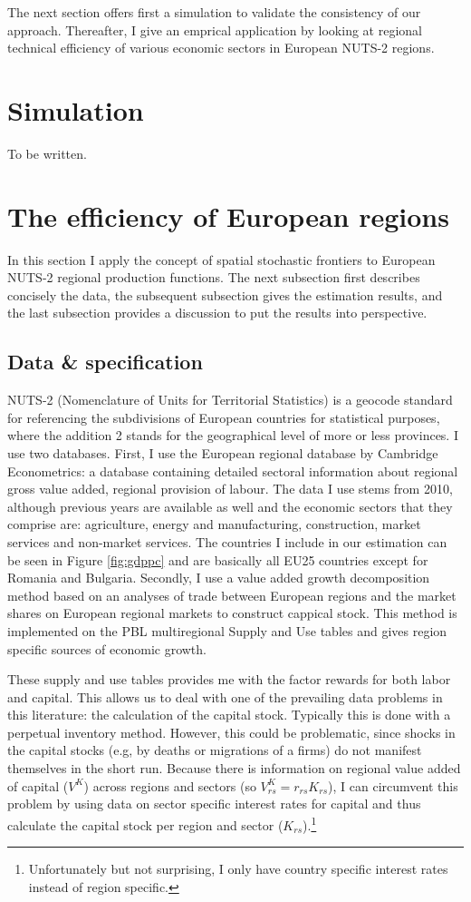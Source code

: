 \documentclass[11pt,parskip,abstracton,notitlepage]{scrartcl}
\begin{document}
The next section offers first a simulation to validate the consistency of our
approach. Thereafter, I give an emprical application by looking at regional technical efficiency of various economic sectors in European NUTS-2 regions.
%
\section{Simulation}

To be written.

\section{The efficiency of European regions\label{sec:Applications}}
%
In this section I apply the concept of spatial stochastic frontiers to European NUTS-2 regional production functions. The next subsection first describes concisely the data, the subsequent subsection gives the estimation results, and the last subsection provides a discussion to put the results into perspective. 
%
\subsection{Data \& specification}
%
NUTS-2 (Nomenclature of Units for Territorial Statistics) is a geocode standard
for referencing the subdivisions of European countries for statistical purposes,
where the addition 2 stands for the geographical level of more or less
provinces. I use two databases. First, I use the European regional database by
Cambridge Econometrics: a database containing detailed sectoral information
about regional gross value added, regional provision of labour. The data I use
stems from 2010, although previous years are available as well and the economic
sectors that they comprise are: agriculture, energy and manufacturing,
construction, market services and non-market services. The countries I include
in our estimation can be seen in Figure \ref{fig:gdppc} and are basically all
EU25 countries except for Romania and Bulgaria. Secondly, I use a value added
growth decomposition method based on an analyses of trade between European
regions and the market shares on European regional markets to construct cappical
stock. This method is implemented on the PBL multiregional Supply and Use tables \citep{Thissen2013b, Thissen2013} and gives region specific sources of economic growth. 

These supply and use tables provides me with the factor rewards for both labor
and capital. This allows us to deal with one of the prevailing data problems in
this literature: the calculation of the capital stock. Typically this is done
with a perpetual inventory method. However, this could be problematic, since
shocks in the capital stocks (e.g, by deaths or migrations of a firms) do not
manifest themselves in the short run. Because there is information on regional
value added of capital ($V^K$) across regions and sectors (so $V^K_{rs} =
r_{rs} K_{rs}$), I can circumvent this problem by using data on sector
specific interest rates for capital and thus calculate the capital stock per
region and sector ($K_{rs}$).\footnote{Unfortunately but not surprising, I only have country specific interest rates instead of region specific.}
\end{document}
